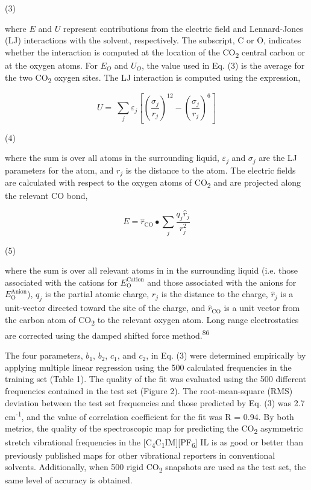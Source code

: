 \documentclass[]{article}
\begin{document}
(3)

where \(E\) and \(U\) represent contributions from the electric field and Lennard-Jones (LJ) interactions with the solvent, respectively. The subscript, C or O, indicates whether the interaction is computed at the location of the CO\textsubscript{2} central carbon or at the oxygen atoms. For \(E_{O}\) and \(U_{O}\), the value used in Eq. (3) is the average for the two CO\textsubscript{2} oxygen sites. The LJ interaction is computed using the expression,

\[U = \ \sum_{j}^{}\varepsilon_{j}\left\lbrack \left( \frac{\sigma_{j}}{r_{j}} \right)^{12} - \left( \frac{\sigma_{j}}{r_{j}} \right)^{6} \right\rbrack\]

(4)

where the sum is over all atoms in the surrounding liquid, \(\varepsilon_{j}\) and \(\sigma_{j}\) are the LJ parameters for the atom, and \(r_{j}\) is the distance to the atom. The electric fields are calculated with respect to the oxygen atoms of CO\textsubscript{2} and are projected along the relevant CO bond,

\[E = {\widehat{r}}_{\mathrm{\text{CO}}} \bullet \sum_{j}^{}\frac{q_{j}{\widehat{r}}_{j}}{r_{j}^{2}}\]

(5)

where the sum is over all relevant atoms in in the surrounding liquid (i.e. those associated with the cations for \(E_{\mathrm{O}}^{\text{Cation}}\) and those associated with the anions for \(E_{\mathrm{O}}^{\text{Anion}}\)), \(q_{j}\) is the partial atomic charge, \(r_{j}\) is the distance to the charge, \({\widehat{r}}_{j}\) is a unit-vector directed toward the site of the charge, and \({\widehat{r}}_{\mathrm{\text{CO}}}\) is a unit vector from the carbon atom of CO\textsubscript{2} to the relevant oxygen atom. Long range electrostatics are corrected using the damped shifted force method.\textsuperscript{86}

The four parameters, \(b_{1}\), \(b_{2}\), \(c_{1}\), and \(c_{2}\), in Eq. (3) were determined empirically by applying multiple linear regression using the 500 calculated frequencies in the training set (Table 1). The quality of the fit was evaluated using the 500 different frequencies contained in the test set (Figure 2). The root-mean-square (RMS) deviation between the test set frequencies and those predicted by Eq. (3) was 2.7 cm\textsuperscript{-1}, and the value of correlation coefficient for the fit was R = 0.94. By both metrics, the quality of the spectroscopic map for predicting the CO\textsubscript{2} asymmetric stretch vibrational frequencies in the {[}C\textsubscript{4}C\textsubscript{1}IM{]}{[}PF\textsubscript{6}{]} IL is as good or better than previously published maps for other vibrational reporters in conventional solvents. Additionally, when 500 rigid CO\textsubscript{2} snapshots are used as the test set, the same level of accuracy is obtained.
\end{document}
